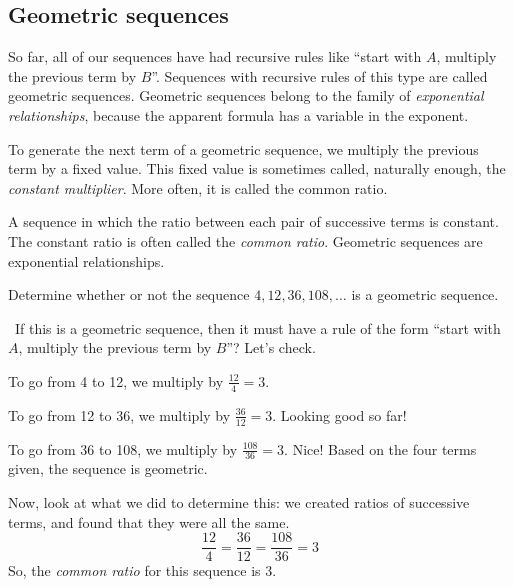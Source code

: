 \subsection{Geometric sequences}

So far, all of our sequences have had recursive rules like ``start with $A$, multiply the previous term by $B$''. Sequences with recursive rules of this type are called \glspl{geometric sequence}. Geometric sequences belong to the family of \textit{exponential relationships}, because the apparent formula has a variable in the exponent.

To generate the next term of a geometric sequence, we multiply the previous term by a fixed value. This fixed value is sometimes called, naturally enough, the \textit{constant multiplier}. More often, it is called the \gls{common ratio}.

\begin{boxdef}
A sequence in which the ratio between each pair of successive terms is constant. The constant ratio is often called the \textit{common ratio}. Geometric sequences are exponential relationships.
\end{boxdef}


\begin{boxex}
Determine whether or not the sequence $4, 12, 36, 108, \dotsc$ is a geometric sequence.

\exsoln\ If this is a geometric sequence, then it must have a rule of the form ``start with $A$, multiply the previous term by $B$''? Let's check.

To go from 4 to 12, we multiply by $\frac{12}{4} = 3$.

To go from 12 to 36, we multiply by $\frac{36}{12} = 3$. Looking good so far!

To go from 36 to 108, we multiply by $\frac{108}{36} = 3$. Nice! Based on the four terms given, the sequence is geometric.

Now, look at what we did to determine this: we created ratios of successive terms, and found that they were all the same. \[\frac{12}{4} = \frac{36}{12} = \frac{108}{36} = 3\] So, the \textit{common ratio} for this sequence is 3.
\end{boxex}

